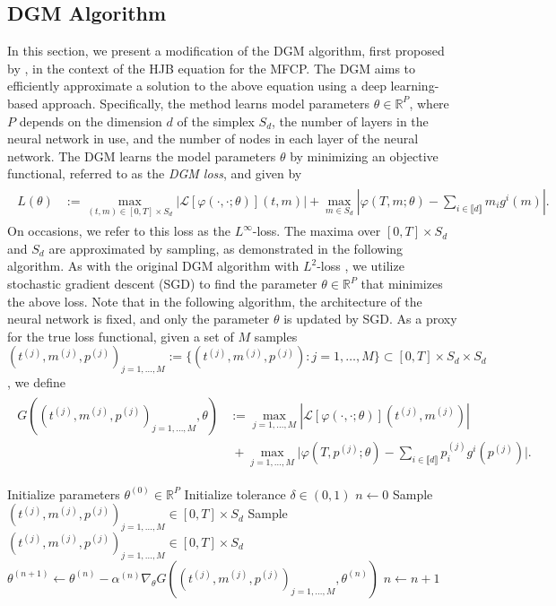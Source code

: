 \documentclass[11pt,reqno]{amsart}
\numberwithin{equation}{section}
\theoremstyle{plain}
\newcommand{\R}{\mathbb{R}}
\newcommand{\sL}{\mathcal{L}}
\newcommand{\lbrs}[1]{\llbracket #1 \rrbracket}
\begin{document}
\subsection{DGM Algorithm}
\label{sec:dgm}
In this section, we present a modification of the DGM algorithm, first proposed by \cite{dgm}, in the context of the HJB equation for the MFCP. 
The DGM aims to efficiently approximate a solution to the above equation using a deep learning-based approach. Specifically, the method learns model parameters $\theta \in \R^P$, where $P$ depends on the dimension $d$ of the simplex $S_d$, the number of layers in the neural network in use, and the number of nodes in each layer of the neural network. The DGM learns the model parameters $\theta$ by minimizing an objective functional, referred to as the {\it DGM loss}, and given by 
\begin{align}
\label{eq:unif-loss}
\begin{split}
L(\theta) &:= \max_{(t, m) \in [0, T] \times S_d} |\sL[\varphi(\cdot, \cdot; \theta)](t,m)| + \max_{m \in S_d}|\varphi(T, m;\theta) - \sum_{i \in \lbrs{d}}m_i g^i(m)|. 
\end{split}
\end{align}
On occasions, we refer to this loss as the $L^\infty$-loss. 
The maxima over $[0, T] \times S_d$ and $S_d$ are approximated by sampling, as demonstrated in the following algorithm. As with the original DGM algorithm with $L^2$-loss \cite{dgm}, we utilize stochastic gradient descent (SGD) to find the parameter $\theta \in \R^P$ that minimizes the above loss. Note that in the following algorithm, the architecture of the neural network is fixed, and only the parameter $\theta$ is updated by SGD. As a proxy for the true loss functional, given a set of $M$ samples $(t^{(j)}, m^{(j)}, p^{(j)})_{j = 1, \ldots, M}:=\{(t^{(j)}, m^{(j)}, p^{(j)}):j = 1, \ldots, M\}  \subset [0,T] \times S_d\times S_d$, we define
\begin{align}
\label{eq:sampled-unif-loss}
\begin{split}
    G((t^{(j)}, m^{(j)}, p^{(j)})_{j = 1, \ldots, M}, \theta) &:= \max_{j = 1, \ldots, M}|\sL[\varphi(\cdot, \cdot; \theta)](t^{(j)},m^{(j)})| \\
    & \ + \max_{j = 1, \ldots, M} \Big|\varphi(T, p^{(j)};\theta) - \sum_{i \in \lbrs{d}}p_i^{(j)} g^i(p^{(j)})\Big|.
\end{split}
\end{align}
\begin{algorithm}[H]
\caption{Uniform DGM}\label{alg:unif-dgm}
\begin{algorithmic}
\State Initialize parameters $\theta^{(0)} \in \R^P$
\State Initialize tolerance $\delta \in (0,1)$
\State $n \gets 0$
\State Sample $(t^{(j)}, m^{(j)}, p^{(j)})_{j = 1, \ldots, M} \in [0,T] \times S_d$
\State Sample $(t^{(j)}, m^{(j)}, p^{(j)})_{j = 1, \ldots, M} \in [0,T] \times S_d$
\State $\theta^{(n+1)} \gets \theta^{(n)} - \alpha^{(n)} \nabla_\theta G((t^{(j)}, m^{(j)}, p^{(j)})_{j = 1, \ldots, M}, \theta^{(n)})$
\State $n \gets n + 1$
\EndWhile
\end{algorithmic}
\end{algorithm}
\end{document}
